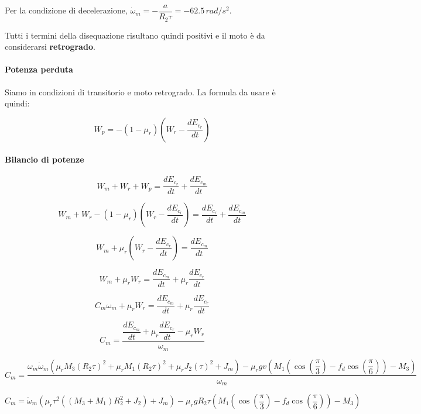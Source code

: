 \documentclass[main.tex]{subfiles}
\begin{document}
Per la condizione di decelerazione, $\dot{\omega}_m = -\dfrac{a}{R_2 \tau} = -62.5\,rad/s^2$.

Tutti i termini della disequazione risultano quindi positivi e il moto è da considerarsi \textbf{retrogrado}.

\paragraph{Potenza perduta} Siamo in condizioni di transitorio e moto retrogrado. La formula da usare è quindi:

\[
	W_p = -(1-\mu_r)(W_r  - \dfrac{dE_{c_r}}{dt})
\]

\paragraph{Bilancio di potenze}

\[
	W_m + W_r + W_p = \dfrac{dE_{c_r}}{dt} + \dfrac{dE_{c_m}}{dt}
\]

\[
	W_m + W_r - (1-\mu_r)(W_r  - \dfrac{dE_{c_r}}{dt}) = \dfrac{dE_{c_r}}{dt} + \dfrac{dE_{c_m}}{dt}
\]

\[
	W_m  + \mu_r(W_r  - \dfrac{dE_{c_r}}{dt}) = \dfrac{dE_{c_m}}{dt}
\]

\[
	W_m  + \mu_r W_r  = \dfrac{dE_{c_m}}{dt} + \mu_r \dfrac{dE_{c_r}}{dt}
\]

\[
	C_m \omega_m  + \mu_r W_r  = \dfrac{dE_{c_m}}{dt} + \mu_r \dfrac{dE_{c_r}}{dt}
\]

\[
	C_m  = \dfrac{\dfrac{dE_{c_m}}{dt} + \mu_r \dfrac{dE_{c_r}}{dt} - \mu_r W_r}{\omega_m}
\]

\[
	C_m  = \dfrac{\omega_m\dot{\omega}_m(\mu_rM_3(R_2 \tau)^2 + \mu_rM_1(R_2 \tau)^2 + \mu_rJ_2(\tau)^2 +  J_m) -\mu_rgv(M_1(\cos\left(\dfrac{\pi}{3} \right ) -  f_d \cos(\dfrac{\pi}{6}))-M_3)}{\omega_m}
\]

\[
	C_m  = \dot{\omega}_m(\mu_r\tau^2((M_3+M_1)R_2^2 + J_2) + J_m) - \mu_rgR_2\tau(M_1(\cos\left(\dfrac{\pi}{3} \right ) -  f_d \cos(\dfrac{\pi}{6}))-M_3)
\]
\end{document}
